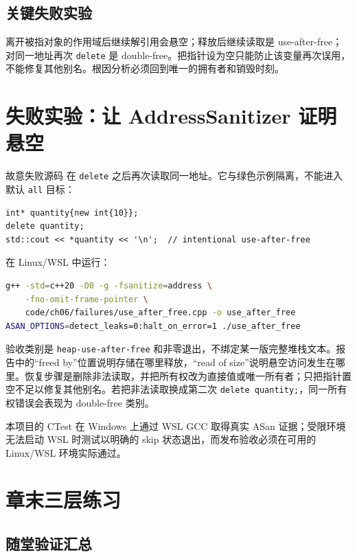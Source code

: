 \subsection{关键失败实验}

离开被指对象的作用域后继续解引用会悬空；释放后继续读取是 use-after-free；对同一地址再次 \texttt{delete} 是 double-free。把指针设为空只能防止该变量再次误用，不能修复其他别名。根因分析必须回到唯一的拥有者和销毁时刻。

\section{失败实验：让 AddressSanitizer 证明悬空}

故意失败源码  在 \texttt{delete} 之后再次读取同一地址。它与绿色示例隔离，不能进入默认 \texttt{all} 目标：

\begin{lstlisting}
int* quantity{new int{10}};
delete quantity;
std::cout << *quantity << '\n';  // intentional use-after-free
\end{lstlisting}

在 Linux/WSL 中运行：

\begin{lstlisting}[language=bash,numbers=none]
g++ -std=c++20 -O0 -g -fsanitize=address \
    -fno-omit-frame-pointer \
    code/ch06/failures/use_after_free.cpp -o use_after_free
ASAN_OPTIONS=detect_leaks=0:halt_on_error=1 ./use_after_free
\end{lstlisting}

验收类别是 \texttt{heap-use-after-free} 和非零退出，不绑定某一版完整堆栈文本。报告中的“freed by”位置说明存储在哪里释放，“read of size”说明悬空访问发生在哪里。恢复步骤是删除非法读取，并把所有权改为直接值或唯一所有者；只把指针置空不足以修复其他别名。若把非法读取换成第二次 \texttt{delete quantity;}，同一所有权错误会表现为 double-free 类别。

本项目的 CTest 在 Windows 上通过 WSL GCC 取得真实 ASan 证据；受限环境无法启动 WSL 时测试以明确的 skip 状态退出，而发布验收必须在可用的 Linux/WSL 环境实际通过。

\section{章末三层练习}

\subsection*{随堂验证汇总}

